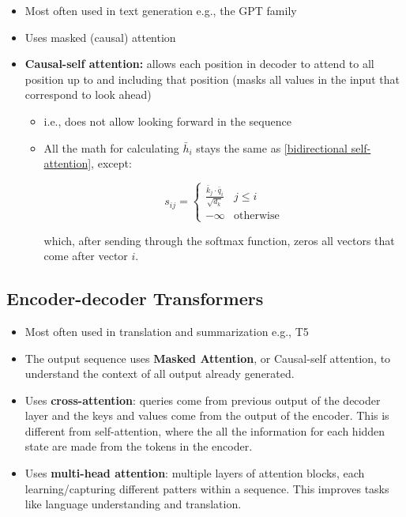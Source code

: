 \documentclass[12pt]{article}
\begin{document}
\begin{itemize}
	\item Most often used in text generation e.g., the GPT family
	\item Uses masked (causal) attention
	\item \textbf{Causal-self attention:} allows each position in decoder to attend to all position up to and including that position (masks all values in the input that correspond to look ahead)
		\begin{itemize}
			\item i.e., does not allow looking forward in the sequence
			\item All the math for calculating $\bar h_i$ stays the same as \ref{bidirectional self-attention}, except:

				\[ 
					s_{ij} = \begin{cases}
						\frac {\bar k_j \cdot \bar q_i} {\sqrt{d_k}} & j \le i\\
						-\infty & \text{otherwise}
					\end{cases}
				\]

				which, after sending through the softmax function, zeros all vectors that come after vector $i$.
		\end{itemize}
\end{itemize}

\subsection{Encoder-decoder Transformers}

\begin{itemize}
	\item Most often used in translation and summarization e.g., T5
	\item The output sequence uses \textbf{Masked Attention}, or Causal-self attention, to understand the context of all output already generated.
	\item Uses \textbf{cross-attention}: queries come from previous output of the decoder layer and the keys and values come from the output of the encoder. This is different from self-attention, where the all the information for each hidden state are made from the tokens in the encoder.
	\item Uses \textbf{multi-head attention}: multiple layers of attention blocks, each learning/capturing different patters within a sequence. This improves tasks like language understanding and translation.
\end{itemize}
\end{document}
